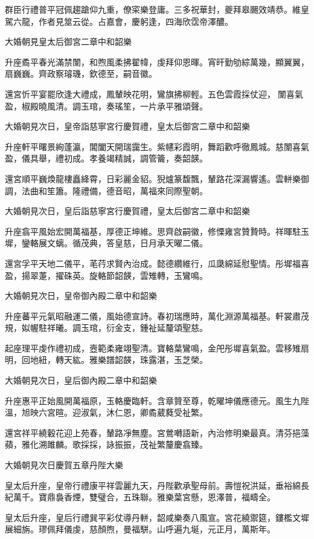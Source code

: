 \begin{pinyinscope}
群臣行禮普平冠佩趨蹌仰九重，僚寀樂登庸。三多祝華封，夔拜皋颺效靖恭。維皇駕六龍，作者見筮云從。占嘉會，慶躬逢，四海欣霑帝澤醲。

大婚朝見皇太后御宮二章中和韶樂

升座矞平春光滿禁闈，和煦風柔拂翟幃，虔拜仰恩暉。宵旰勤劬綜萬幾，顯翼翼，扇巍巍。齊政察璿璣，欽德至，嗣音徽。

還宮忻平宴罷欣逢大禮成，鳳輦映花明，鸞旗拂柳輕。五色雲霞採仗迎，闈喜氣盈，椒殿曉風清。調玉琯，奏瑤笙，一片承平雅頌聲。

大婚朝見次日，皇帝詣慈寧宮行慶賀禮，皇太后御宮二章中和韶樂

升座軒平曙景絢蓬瀛，閶闔天開瑞靄生。紫幰彩霞明，舞蹈歡呼徹鳳城。慈闈喜氣盈，儀具舉，禮初成。孝養竭精誠，調管籥，奏韶韺。

還宮順平巍煥龍樓矗絳霄，日彩麗金貂。猊爐篆馥飄，輦路花深漏響遙。雲軿樂御調，法曲和笙簫。隆禮備，德音昭，萬福來同際聖朝。

大婚朝見次日，皇后詣慈寧宮行慶賀禮，皇太后御宮二章中和韶樂

升座翕平風始宏開萬福基，厚德正坤維。思齊啟嗣徽，修慄雍宮贊贄時。祥暉駐玉墀，鑾輅展文螭。循茂典，答皇慈，日月承天曜二儀。

還宮孚平天地二儀平，芼荇求賢內治成。懿德纘維行，瓜瓞綿延慰聖情。彤墀福喜盈，揚翠萐，擢硃英。旋輅節韶韺，雲雉轉，玉鸞鳴。

大婚朝見次日，皇帝御內殿二章中和韶樂

升座蕃平元氣昭融運二儀，風始德宣詩。春初瑞應時，萬化淵源萬福基。軒裳肅茂規，姒幄駐祥曦。調玉琯，衍金支，鍾祉延釐頌聖慈。

起座理平虔作禮初成，壼範柔雍翊聖清。寶輅葉鸞鳴，金戺彤墀喜氣盈。雲移雉扇明，回地紐，轉天紘。雅樂譜韶韺，珠露湛，玉芝榮。

大婚朝見次日，皇后御內殿二章中和韶樂

升座惠平正始風開萬福原，玉輅慶臨軒。含章贊至尊，乾曜坤儀應德元。風生九陛溫，旭映六宮暄。迎淑氣，沐仁恩，卿矞葳蕤受祉繁。

還宮祥平繞轂花迎上苑春，輦路凈無塵。宮鶯囀語新，內治修明樂最真。清芬挹藻蘋，雅化溯雎麟。歌採採，詠振振，茂祉繁釐慶翕臻。

大婚朝見次日慶賀五章丹陛大樂

皇太后升座，皇帝行禮康平祥雲麗九天，丹陛歡承聖母前。壽愷祝洪延，垂裕綿長紀萬千。寶鼎裊香煙，雙璧合，五珠聯。雅樂葉宮懸，恩澤普，福疇全。

皇太后升座，皇后行禮巽平彩仗導丹軿，韶咸樂奏八風宣。宮花繞禦筵，鏤檻文墀展細旃。璆佩拜儀虔，慈顏煦，曼福駢。山呼遍九埏，元正月，萬斯年。


\end{pinyinscope}
